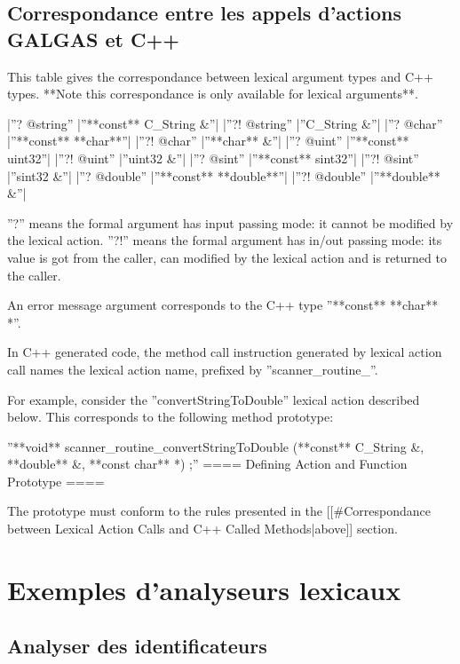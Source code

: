 \subsection{Correspondance entre les appels d'actions GALGAS et C++}

This table gives the correspondance between lexical argument types and C++ types. **Note this correspondance is only available for lexical arguments**.

|''? @string''  |''**const** C\_String \&''|
|''?! @string''  |''C\_String \&''|
|''? @char''  |''**const** **char**''|
|''?! @char''  |''**char** \&''|
|''? @uint''  |''**const** uint32''|
|''?! @uint''  |''uint32 \&''|
|''? @sint''  |''**const** sint32''|
|''?! @sint''  |''sint32 \&''|
|''? @double''  |''**const** **double**''|
|''?! @double''  |''**double** \&''|

''?'' means the formal argument has input passing mode: it cannot be modified by the lexical action. ''?!'' means the formal argument has in/out passing mode: its value is got from the caller, can modified by the lexical action and is returned to the caller.

An error message argument corresponds to the C++ type ''**const** **char** *''.

In C++ generated code, the method call instruction generated by lexical action call names the lexical action name, prefixed by ''scanner\_routine\_''.

For example, consider the ''convertStringToDouble'' lexical action described below. This corresponds to the following method prototype:

''**void** scanner\_routine\_convertStringToDouble (**const** C\_String \&, **double** \&, **const char** *) ;''
==== Defining Action and Function Prototype ====

The prototype must conform to the rules presented in the [[\#Correspondance between Lexical Action Calls and C++ Called Methods|above]] section.


\section{Exemples d'analyseurs lexicaux}

\subsection{Analyser des identificateurs}

